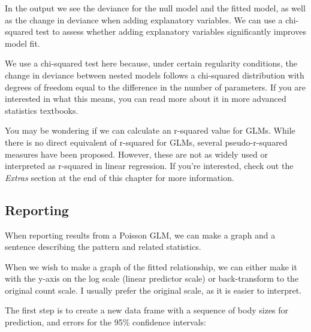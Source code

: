 \documentclass[
  letterpaper,
  8pt,
  a4paper]{book}
\begin{document}
In the output we see the deviance for the null model and the fitted
model, as well as the change in deviance when adding explanatory
variables. We can use a chi-squared test to assess whether adding
explanatory variables significantly improves model fit.

We use a chi-squared test here because, under certain regularity
conditions, the change in deviance between nested models follows a
chi-squared distribution with degrees of freedom equal to the difference
in the number of parameters. If you are interested in what this means,
you can read more about it in more advanced statistics textbooks.

You may be wondering if we can calculate an r-squared value for GLMs.
While there is no direct equivalent of r-squared for GLMs, several
pseudo-r-squared measures have been proposed. However, these are not as
widely used or interpreted as r-squared in linear regression. If you're
interested, check out the \emph{Extras} section at the end of this
chapter for more information.

\subsection*{Reporting}\label{reporting-2}

When reporting results from a Poisson GLM, we can make a graph and a
sentence describing the pattern and related statistics.

When we wish to make a graph of the fitted relationship, we can either
make it with the y-axis on the log scale (linear predictor scale) or
back-transform to the original count scale. I usually prefer the
original scale, as it is easier to interpret.

The first step is to create a new data frame with a sequence of body
sizes for prediction, and errors for the 95\% confidence intervals:
\end{document}

